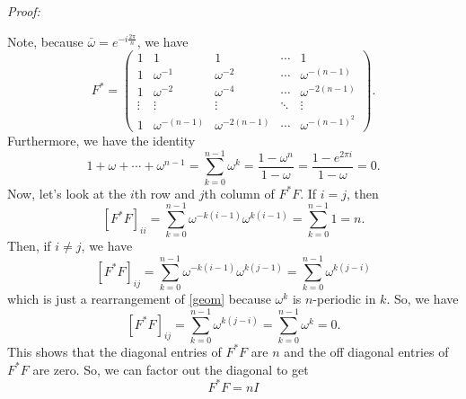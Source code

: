 \documentclass[a4paper,12pt]{article}
\newcommand{\pmat}[1]{\begin{pmatrix} #1 \end{pmatrix}}
\newenvironment{proof}[2][$\square$]
    {\setlength{\parskip}{0pt}\par\textit{Proof:} #2\setlength{\parskip}{0.25cm}
        \savebox{\qed}{#1}
        \begin{adjustwidth}{\widthof{Proof:}}{}
    }
    {
        \hfill\usebox{\qed}\end{adjustwidth}
    }
\begin{document}
\begin{enumerate}[label = (\arabic*)]
	\begin{proof}{}
		Note, because $ \bar{\omega} = e^{-i \frac{2\pi}{n}} $, we have
		\[
			F^* = 
			\pmat{
				1 & 1 & 1 & \cdots & 1 \\
				1 & \omega^{-1} & \omega^{-2} & \cdots & \omega^{-(n - 1)} \\
				1 & \omega^{-2} & \omega^{-4} & \cdots & \omega^{-2(n - 1)} \\
				\vdots & \vdots & \vdots & \ddots & \vdots \\
				1 & \omega^{-(n - 1)} & \omega^{-2 (n - 1)} & \cdots & \omega^{-(n - 1)^2}
			}.
		\]
		Furthermore, we have the identity
		\begin{equation}
			1 + \omega + \cdots + \omega^{n - 1} = \sum_{k = 0}^{n - 1} \omega^k = \frac{1 - \omega^n}{1 - \omega} = \frac{1 - e^{2\pi i}}{1 - \omega} = 0. \label{geom}
		\end{equation}
		Now, let's look at the $ i $th row and $ j $th column of $ F^* F $. If $ i = j $, then
		\[
			[F^* F]_{i i} = \sum_{k = 0}^{n - 1} \omega^{-k (i - 1)} \omega^{k (i - 1)} = \sum_{k = 0}^{n - 1} 1 = n.
		\]
		Then, if $ i \neq j $, we have
		\[
			[F^* F]_{i j} = \sum_{k = 0}^{n - 1} \omega^{-k(i - 1)} \omega^{k(j - 1)} = \sum_{k = 0}^{n - 1} \omega^{k (j - i)}
		\]
		which is just a rearrangement of \eqref{geom} because $ \omega^{k} $ is $ n $-periodic in $ k $. So, we have
		\[
			[F^* F]_{i j} = \sum_{k = 0}^{n - 1} \omega^{k (j - i)} = \sum_{k = 0}^{n - 1} \omega^{k} = 0.
		\]
		This shows that the diagonal entries of $ F^* F $ are $ n $ and the off diagonal entries of $ F^* F $ are zero. So, we can factor out the diagonal to get
		\[
			F^* F = n I
		\]
	\end{proof}
\end{enumerate}
\end{document}
